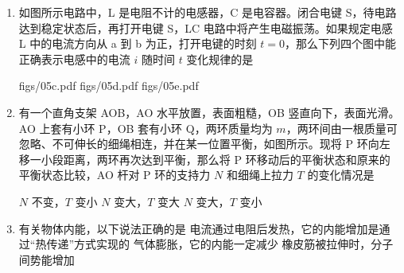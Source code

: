 \documentclass[\gkver]{gaokaozhenti}
\begin{document}
\begin{enumerate}
\onepicture[w=6cm]{}

{正常发光}
{比正常发光略亮}
{有可能被烧坏}


\item
如图所示电路中，L 是电阻不计的电感器，C 是电容器。闭合电键 S，待电路达到稳定状态后，再打开电键 S，LC 电路中将产生电磁振荡。如果规定电感 L 中的电流方向从 a 到 b 为正，打开电键的时刻 $t = 0$，那么下列四个图中能正确表示电感中的电流 $i$ 随时间 $t$ 变化规律的是

\onepicture[w=4.5cm]{}

{figs/05c.pdf}
{figs/05d.pdf}
{figs/05e.pdf}


\item
有一个直角支架 AOB，AO 水平放置，表面粗糙，OB 竖直向下，表面光滑。AO 上套有小环 P，OB 套有小环 Q，两环质量均为 $m$，两环间由一根质量可忽略、不可伸长的细绳相连，并在某一位置平衡，如图所示。现将 P 环向左移一小段距离，两环再次达到平衡，那么将 P 环移动后的平衡状态和原来的平衡状态比较，AO 杆对 P 环的支持力 $N$ 和细绳上拉力 $T$ 的变化情况是

\onepicture[w=4.5cm]{}

{$N$ 不变，$T$ 变小}
{$N$ 变大，$T$ 变大}
{$N$ 变大，$T$ 变小}


\item
有关物体内能，以下说法正确的是
{电流通过电阻后发热，它的内能增加是通过“热传递”方式实现的}
{气体膨胀，它的内能一定减少}
{橡皮筋被拉伸时，分子间势能增加}


\end{enumerate}
\end{document}
